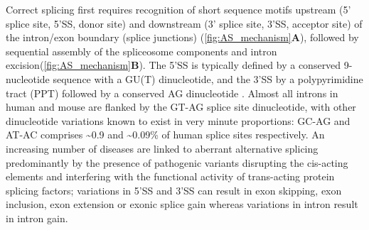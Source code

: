 Correct splicing first requires recognition of short sequence motifs upstream (5' splice site, 5'SS, donor site) and downstream (3' splice site, 3'SS, acceptor site) of the intron/exon boundary (splice junctions) (\cref{fig:AS_mechanism}\textbf{A}),  followed by sequential assembly of the spliceosome components and intron excision\cite{Herzel2017}(\cref{fig:AS_mechanism}\textbf{B}). The 5'SS is typically defined by a conserved 9-nucleotide sequence with a GU(T) dinucleotide, and the 3'SS by a polypyrimidine tract (PPT) followed by a conserved AG dinucleotide \cite{Will2011}. Almost all introns in human and mouse are flanked by the GT-AG splice site dinucleotide\cite{Sheth2006}, with other dinucleotide variations known to exist in very minute proportions: GC-AG and AT-AC comprises \textasciitilde0.9 and \textasciitilde0.09\% of human splice sites respectively\cite{Parada2014}. An increasing number of diseases are linked to aberrant alternative splicing predominantly by the presence of pathogenic variants disrupting the cis-acting elements and interfering with the functional activity of trans-acting protein splicing factors\cite{Li2017b}; variations in 5'SS and 3'SS can result in exon skipping, exon inclusion, exon extension or exonic splice gain whereas variations in intron result in intron gain.

